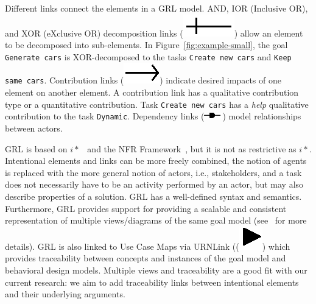 Different links connect the elements in a GRL model. AND, IOR (Inclusive OR), and XOR (eXclusive OR) decomposition links (\includegraphics[scale=1]{img/decomposition}) allow an element to be decomposed into sub-elements. In Figure~\ref{fig:example-small}, the goal \texttt{Generate cars} is XOR-decomposed to the tasks \texttt{Create new cars} and \texttt{Keep same cars}. Contribution links (\includegraphics[scale=1]{img/contribution}) indicate desired impacts of one element on another element. A contribution link has a qualitative contribution type or a quantitative contribution. Task  \texttt{Create new cars} has a \emph{help} qualitative contribution to the task \texttt{Dynamic}. Dependency links (\includegraphics[scale=1]{img/dependency}) model relationships between actors. 

GRL is based on $i*$~\cite{Yu:1997:TMR:827255.827807} and the NFR Framework~\cite{chung2012non}, but it is not as restrictive as $i*$. Intentional elements and links can be more freely combined, the notion of agents is replaced with the more general notion of actors, i.e., stakeholders, and a task does not necessarily have to be an activity performed by an actor, but may also describe properties of a solution. GRL has a well-defined syntax and semantics. Furthermore, GRL provides support for providing a scalable and consistent representation of multiple views/diagrams of the same goal model (see~\cite[Ch.2]{Ghanavati2013} for more details). GRL is also linked to Use Case Maps via URNLink ((\includegraphics[scale=1]{img/urnlink}) which provides traceability between concepts and instances of the goal model and behavioral design models. Multiple views and traceability are a good fit with our current research: we aim to add traceability links between intentional elements and their underlying arguments. 

